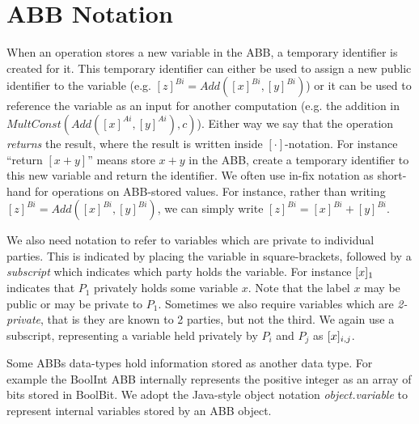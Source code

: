 \section{ABB Notation}

When an operation stores a new variable in the ABB, 
a temporary identifier is created for it.
This temporary identifier can either be used to assign a new public identifier to
the variable (e.g. $[z]^{Bi} = Add([x]^{Bi},[y]^{Bi})$)
or it can be used to reference the variable as an input for another computation
(e.g. the addition in $MultConst(Add([x]^{Ai}, [y]^{Ai}), c)$).
Either way we say that the operation \emph{returns} the result,
where the result is written inside $[\cdot]$-notation.
For instance ``return $[x+y]$'' means store $x + y$ in the ABB,
create a temporary identifier to this new variable and return the identifier.
We often use in-fix notation as short-hand for operations on ABB-stored values.
For instance, rather than writing $[z]^{Bi} = Add([x]^{Bi}, [y]^{Bi})$, we can simply write
$[z]^{Bi} = [x]^{Bi} + [y]^{Bi}$.

We also need notation to refer to variables which are private to individual parties.
This is indicated by placing the variable in square-brackets,
followed by a \emph{subscript} which indicates which party holds the variable.
For instance $[x]_{1}$ indicates that $P_1$ privately holds some variable $x$.
Note that the label $x$ may be public or may be private to $P_1$.
Sometimes we also require variables which are \emph{2-private},
that is they are known to 2 parties, but not the third.
We again use a subscript, representing a variable held privately by $P_i$ and $P_j$
as $[x]_{i,j}$.

Some ABBs data-types hold information stored as another data type.
For example the BoolInt ABB internally represents the positive integer
as an array of bits stored in BoolBit.
We adopt the Java-style object notation \textit{object.variable}
to represent internal variables stored by an ABB object.

